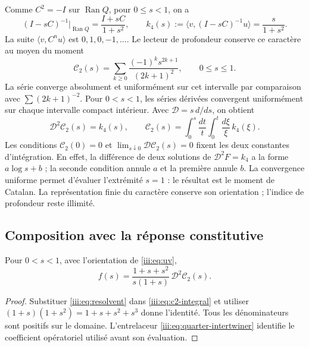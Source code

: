 Comme $C^2=-I$ sur $\operatorname{Ran}Q$, pour $0\leq s<1$, on a
\begin{equation}
 (I-sC)^{-1}\big|_{\operatorname{Ran}Q}=\frac{I+sC}{1+s^2},
 \qquad k_4(s):=\langle v,(I-sC)^{-1}u\rangle=\frac{s}{1+s^2}.
 \label{iii:eq:resolvent}
\end{equation}
La suite $\langle v,C^nu\rangle$ est $0,1,0,-1,\ldots$. Le lecteur
de profondeur conserve ce caractère au moyen du moment
\begin{equation}
 \mathcal C_2(s)=\sum_{k\geq0}\frac{(-1)^ks^{2k+1}}{(2k+1)^2},
 \qquad 0\leq s\leq1.
 \label{iii:eq:c2}
\end{equation}
La série converge absolument et uniformément sur cet intervalle par
comparaison avec $\sum(2k+1)^{-2}$. Pour $0<s<1$, les séries dérivées
convergent uniformément sur chaque intervalle compact intérieur. Avec
$\mathcal D=s\,d/ds$, on obtient
\begin{equation}
 \mathcal D^2\mathcal C_2(s)=k_4(s),\qquad
 \mathcal C_2(s)=\int_0^s\frac{dt}{t}\int_0^t\frac{d\xi}{\xi}\,k_4(\xi).
 \label{iii:eq:c2-integral}
\end{equation}
Les conditions $\mathcal C_2(0)=0$ et
$\lim_{s\downarrow0}\mathcal D\mathcal C_2(s)=0$ fixent les deux constantes
d’intégration. En effet, la différence de deux solutions de
$\mathcal D^2F=k_4$ a la forme $a\log s+b$ ; la seconde condition
annule $a$ et la première annule $b$.
La convergence uniforme permet d’évaluer l’extrémité $s=1$ : le résultat est
le moment de Catalan. La représentation finie du caractère conserve son
orientation ; l’indice de profondeur reste illimité.

\subsection{Composition avec la réponse constitutive}

\begin{theorem}
Pour $0<s<1$, avec l’orientation de \eqref{iii:eq:uv},
\begin{equation}
 f(s)=\frac{1+s+s^2}{s(1+s)}\,\mathcal D^2\mathcal C_2(s).
 \label{iii:eq:catalan-vacuum}
\end{equation}
\end{theorem}
\begin{proof}
Substituer \eqref{iii:eq:resolvent} dans \eqref{iii:eq:c2-integral} et utiliser
$(1+s)(1+s^2)=1+s+s^2+s^3$ donne l’identité. Tous les dénominateurs sont
positifs sur le domaine. L’entrelaceur \eqref{iii:eq:quarter-intertwiner}
identifie le coefficient opératoriel utilisé avant son évaluation.
\end{proof}

